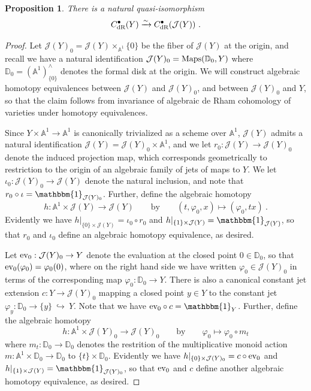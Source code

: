 \documentclass[11pt]{amsart}
\numberwithin{equation}{section}
\newtheorem{prop}[theo]{Proposition}
\theoremstyle{definition}
\newcommand{\bb}{\mathbb}
\newcommand{\mc}{\mathcal}
\newcommand{\into}{{\ \hookrightarrow\ }}
\newcommand{\dR}{{\textup{dR}}}
\newcommand{\Maps}{{\textup{Maps}}}
\newcommand{\ev}{{\textup{ev}}}
\newcommand{\0}{{\textbf{0}}}
\newcommand{\id}{{\textup{id}}}
\def \id{\mathbbm{1}}
\begin{document}
\begin{prop} \label{prop:dR of arc is dR}
There is a natural quasi-isomorphism
\[ C^\bullet_\dR(Y) \xrightarrow{\sim}  C^\bullet_\dR(\mc J(Y)) \ . \]
\end{prop}
\begin{proof} Let $\mc J(Y)_0=\mc J(Y)\times_{\bb A^1}\{0\}$ be the fiber of $\mc J(Y)$ at the origin, and recall we have a natural identification $\mc J(Y)_0=\Maps(\bb D_0,Y)$ where $\bb D_0 = (\bb A^1)^\wedge_{\{0\}}$ denotes the formal disk at the origin. We will construct algebraic homotopy equivalences between $\mc J(Y)$ and $\mc J(Y)_0$, and between $\mc J(Y)_0$ and $Y$, so that the claim follows from invariance of algebraic de Rham cohomology of varieties under homotopy equivalences.

Since $Y\times \bb A^1 \to \bb A^1$ is canonically trivialized as a scheme over $\bb A^1$, $\mc J(Y)$ admits a natural identification $\mc J(Y)= \mc J(Y)_0\times \bb A^1$, and we let $r_0:\mc J(Y) \to \mc J(Y)_0$ denote the induced projection map, which corresponds geometrically to restriction to the origin of an algebraic family of jets of maps to $Y$. We let $\iota_0:\mc J(Y)_0 \to \mc J(Y)$ denote the natural inclusion, and note that $r_0\circ \iota = \id_{\mc J(Y)_0}$. Further, define the algebraic homotopy
\[ h:\bb A^1\times \mc J(Y) \to \mc J(Y) \qquad \text{by}\qquad (t,\varphi_0,x) \mapsto (\varphi_0,tx) \ .  \]
Evidently we have $h|_{\{0\}\times \mc J(Y)}=\iota_0\circ r_0$ and $h|_{\{1\}\times \mc J(Y)}=\id_{ \mc J(Y)}$, so that $r_0$ and $\iota_0$ define an algebraic homotopy equivalence, as desired.

Let $\ev_0:\mc J(Y)_0\to Y$ denote the evaluation at the closed point $0\in \bb D_0$, so that $\ev_0(\varphi_0)=\varphi_0(0)$, where on the right hand side we have written $\varphi_0 \in \mc J(Y)_0$ in terms of the corresponding map $\varphi_0:\bb D_0 \to Y$. There is also a canonical constant jet extension $c:Y \to \mc J(Y)_0$ mapping a closed point $y \in Y$ to the constant jet $\varphi_y:\bb D_0 \to \{y\} \into Y$. Note that we have $\ev_0\circ c = \id_Y$. Further, define the algebraic homotopy
\[ h:\bb A^1\times \mc J(Y)_0 \to \mc J(Y)_0 \qquad \text{by}\qquad \varphi_0\mapsto \varphi_0\circ m_t\]
where $m_t:\bb D_0\to \bb D_0$ denotes the restrition of the multiplicative monoid action $m:\bb A^1\times \bb D_0\to \bb D_0$ to $\{t\}\times \bb D_0$. Evidently we have $h|_{\{0\}\times \mc J(Y)_0}=c\circ \ev_0$ and $h|_{\{1\}\times \mc J(Y)}=\id_{ \mc J(Y)_0}$, so that $\ev_0$ and $c$ define another algebraic homotopy equivalence, as desired.

\end{proof}
\end{document}
